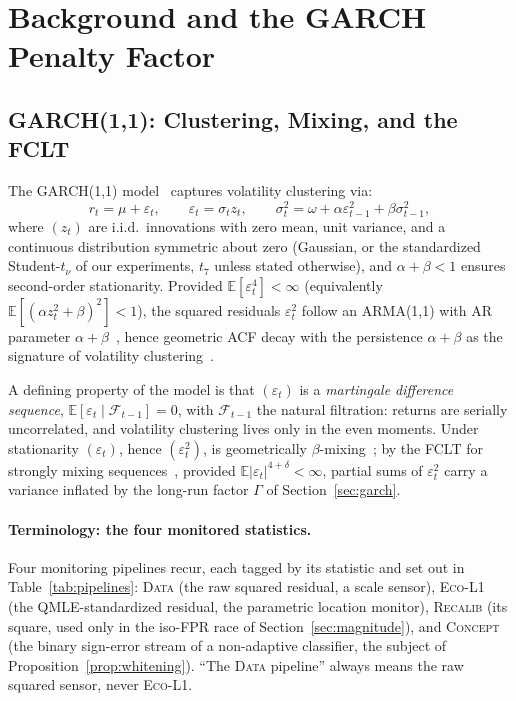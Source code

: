 \documentclass[sigconf,anonymous,review]{acmart}
\theoremstyle{acmdefinition}
\begin{document}
\section{Background and the GARCH Penalty Factor}\label{sec:background}

\subsection{GARCH(1,1): Clustering, Mixing, and the FCLT}\label{sec:garch_model}
The GARCH(1,1) model~\cite{bollerslev_1986, engle_1982} captures volatility clustering via:
\begin{equation}
    r_t = \mu + \varepsilon_t, \qquad \varepsilon_t = \sigma_t z_t, \qquad \sigma_t^2 = \omega + \alpha \varepsilon_{t-1}^2 + \beta \sigma_{t-1}^2,
\end{equation}
where $(z_t)$ are i.i.d.\ innovations with zero mean, unit variance, and a continuous distribution symmetric about zero (Gaussian, or the standardized Student-$t_\nu$ of our experiments, $t_7$ unless stated otherwise), and $\alpha + \beta < 1$ ensures second-order stationarity.
Provided $\mathbb{E}[\varepsilon_t^4] < \infty$ (equivalently $\mathbb{E}[(\alpha z_t^2 + \beta)^2] < 1$), the squared residuals $\varepsilon_t^2$ follow an ARMA(1,1) with AR parameter $\alpha + \beta$~\cite{francq_garch_2010}, hence geometric ACF decay with the persistence $\alpha + \beta$ as the signature of volatility clustering~\cite{ding_1993}.

A defining property of the model is that $(\varepsilon_t)$ is a \emph{martingale difference sequence}, $\mathbb{E}[\varepsilon_t \mid \mathcal{F}_{t-1}] = 0$, with $\mathcal{F}_{t-1}$ the natural filtration: returns are serially uncorrelated, and volatility clustering lives only in the even moments. Under stationarity $(\varepsilon_t)$, hence $(\varepsilon_t^2)$, is geometrically $\beta$-mixing~\cite{carrasco_mixing_2002}; by the FCLT for strongly mixing sequences~\cite{herrndorf_1984, merlevede_2006}, provided $\mathbb{E}|\varepsilon_t|^{4+\delta} < \infty$, partial sums of $\varepsilon_t^2$ carry a variance inflated by the long-run factor $\Gamma$ of Section~\ref{sec:garch}.

\paragraph{Terminology: the four monitored statistics.}\label{sec:terminology}
Four monitoring pipelines recur, each tagged by its statistic and set out in Table~\ref{tab:pipelines}: \textsc{Data} (the raw squared residual, a scale sensor), \textsc{Eco-L1} (the QMLE-standardized residual, the parametric location monitor), \textsc{Recalib} (its square, used only in the iso-FPR race of Section~\ref{sec:magnitude}), and \textsc{Concept} (the binary sign-error stream of a non-adaptive classifier, the subject of Proposition~\ref{prop:whitening}). ``The \textsc{Data} pipeline'' always means the raw squared sensor, never \textsc{Eco-L1}.
\end{document}
